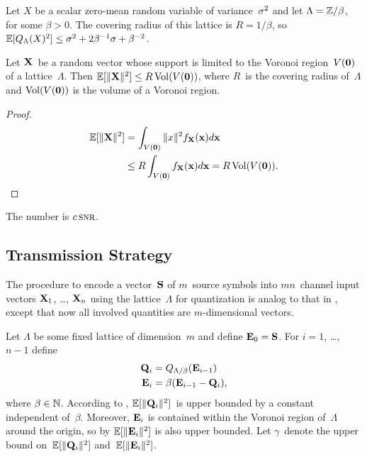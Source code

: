 \begin{example}
  Let $X$ be a scalar zero-mean random variable of variance~$\sq$ and let
  $\Lambda = \Z / \beta$, for some $\beta > 0$. The covering radius of this
  lattice is $R = 1/\beta$, so $\E[\QL(X)^2] \le \sq + 2 \beta^{-1} \sigma +
  \beta^{-2}$.
\end{example}

\begin{lemma}
  \label{lem:voronoivarbound}
  Let $\X$~be a random vector whose support is limited to the Voronoi
  region~$V(\vz)$ of a lattice~$\Lambda$. Then $\E[\|\X\|^2] \le
  R\Vol(V(\vz))$, where $R$~is the covering
  radius of~$\Lambda$ and $\Vol(V(\vz))$ is the volume of a Voronoi region.
\end{lemma}

\begin{proof}
  \begin{align*}
    \E[\|\X\|^2] & = \int_{V(\vz)} \|x\|^2 \fXv(\x) d\x \\
    & \le R \int_{V(\vz)} \fXv(\x) d\x = R \Vol(V(\vz)).
  \end{align*}
\end{proof}


The number is $c\snr$.


\subsection{Transmission Strategy}

The procedure to encode a vector~$\S$ of $m$~source symbols into $mn$~channel
input vectors $\X_1$, \ldots, $\X_n$ using the lattice~$\Lambda$ for
quantization is analog to that in , except that now all
involved quantities are $m$-dimensional vectors.

Let $\Lambda$ be some fixed lattice of dimension~$m$ and define $\Evc_0 = \S$.
For $i = 1$, \ldots, $n-1$ define
\begin{align}
  \Q_i &= \QLb(\Evc_{i-1})  \nonumber \\
  \Evc_i &= \beta ( \Evc_{i-1} - \Q_i), \label{eq:latticeQE}
\end{align}
where $\beta \in \NN$. According to , $\E[\|\Q_i\|^2]$~is
upper bounded by a constant independent of~$\beta$. Moreover, $\Evc_i$
is contained within the Voronoi region of~$\Lambda$ around the origin, so by
 $\E[\|\Evc_i\|^2]$ is also upper bounded. Let
$\gamma$~denote the upper bound on~$\E[\|\Q_i\|^2]$ and~$\E[\|\Evc_i\|^2]$.

